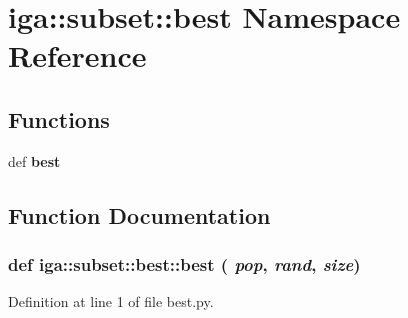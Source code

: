 \section{iga::subset::best Namespace Reference}
\label{namespaceiga_1_1subset_1_1best}


\subsection*{Functions}
\begin{CompactItemize}
\item 
def {\bf best}
\end{CompactItemize}


\subsection{Function Documentation}
\subsubsection{\setlength{\rightskip}{0pt plus 5cm}def iga::subset::best::best ( {\em pop},  {\em rand},  {\em size})}\label{namespaceiga_1_1subset_1_1best_0143d67edd114165697390356a8e0a9a}




Definition at line 1 of file best.py.